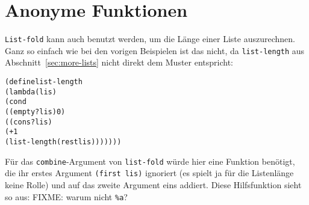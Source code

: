 \section{Anonyme Funktionen}\label{sec:anonymous-procedures}

\texttt{List-fold} kann auch benutzt werden, um die Länge einer Liste
auszurechnen.  Ganz so einfach wie bei den vorigen Beispielen ist das
nicht, da \texttt{list-length} aus
Abschnitt~\ref{sec:more-lists} nicht direkt dem Muster entspricht:
%
\begin{alltt}
(define list-length
  (lambda (lis)
    (cond
      ((empty? lis) 0)
      ((cons? lis) 
       (+ 1 
          (list-length (rest lis)))))))
\end{alltt}
%
Für das \texttt{combine}-Argument von \texttt{list-fold}
würde hier eine Funktion benötigt, die ihr erstes
Argument \texttt{(first lis)} ignoriert (es spielt ja für die Listenlänge
keine Rolle) und auf das zweite Argument eins addiert.  Diese
Hilfsfunktion sieht so aus:
%
FIXME: warum nicht \texttt{\%a}?

